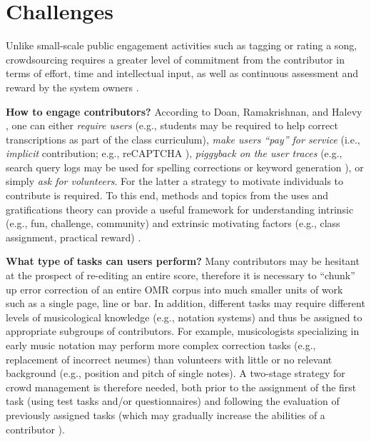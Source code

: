 \documentclass{sig-alternate}
\begin{document}
\section{Challenges}

Unlike small-scale public engagement activities such as tagging or rating a song, crowdsourcing requires a greater level of commitment from the contributor in terms of effort, time and intellectual input, as well as continuous assessment and reward by the system owners \cite{holley2010}. 

\textbf{How to engage contributors?} According to Doan, Ramakrishnan, and Halevy \cite{doan2011}, one can either \emph{require users} (e.g., students may be required to help correct transcriptions as part of the class curriculum), \emph{make users ``pay'' for service} (i.e., \emph{implicit} contribution; e.g., reCAPTCHA \cite{ahn2008}), \emph{piggyback on the user traces} (e.g., search query logs may be used for spelling corrections \cite{ahmad2005} or keyword generation \cite{fuxman2008}), or simply \emph{ask for volunteers}. For the latter a strategy to motivate individuals to contribute is required. To this end, methods and topics from the uses and gratifications theory can provide a useful framework for understanding intrinsic (e.g., fun, challenge, community) and extrinsic motivating factors (e.g., class assignment, practical reward) \cite{brabham2013}. 

\textbf{What type of tasks can users perform?} Many contributors may be hesitant at the prospect of re-editing an entire score, therefore it is necessary to ``chunk'' up error correction of an entire OMR corpus into much smaller units of work such as a single page, line or bar. In addition, different tasks may require different levels of musicological knowledge (e.g., notation systems) and thus be assigned to appropriate subgroups of contributors. For example, musicologists specializing in early music notation may perform more complex correction tasks (e.g., replacement of incorrect neumes) than volunteers with little or no relevant background (e.g., position and pitch of single notes). A two-stage strategy for crowd management is therefore needed, both prior to the assignment of the first task (using test tasks and/or questionnaires) and following the evaluation of previously assigned tasks (which may gradually increase the abilities of a contributor \cite{shen2003}).  
\end{document}
